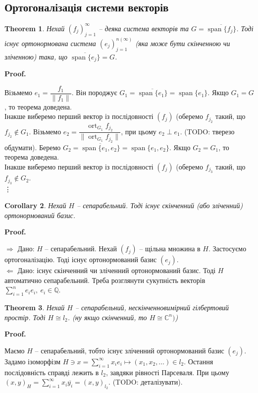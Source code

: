 \documentclass[a4paper, 10pt]{article}
\makeatletter
\def\rightproof{$\boxed{\Rightarrow}$ }
\def\leftproof{$\boxed{\Leftarrow}$ }
\theoremstyle{theoremdd}
\newtheorem{theorem}{Theorem}[subsection]
\theoremstyle{theoremdd}
\theoremstyle{theoremdd}
\theoremstyle{theoremdd}
\theoremstyle{theoremdd}
\theoremstyle{theoremdd}
\theoremstyle{theoremdd}
\theoremstyle{theoremdd}
\newtheorem{corollary}[theorem]{Corollary}
\DeclareMathOperator{\ort}{ort}
\renewenvironment{proof}[1][Proof.\\]{\par
\pushQED{\hfill \qed}%
\normalfont \topsep6\p@\@plus6\p@\relax
\trivlist
\item\relax
{\bfseries
#1\@addpunct{.}}\hspace\labelsep\ignorespaces
}{%
\popQED\endtrivlist\@endpefalse
}
\DeclareMathOperator{\linspan}{span}
\makeatother
\begin{document}
\subsection{Ортогоналізація системи векторів}
\begin{theorem}
Нехай $(f_j)_{j=1}^\infty$ -- деяка система векторів та $G = \overline{\linspan\{f_j\}}$. Тоді існує ортонормована система $(e_j)_{j=1}^{n (\infty)}$ (яка може бути скінченною чи зліченною) така, що $\overline{\linspan\{e_j\}} = G$.
\end{theorem}

\begin{proof}
Візьмемо $e_1 = \dfrac{f_1}{\|f_1\|}$. Він породжує $G_1 = \overline{\linspan\{e_1\}} = \linspan\{e_1\}$. Якщо $G_1 = G$, то теорема доведена.\\
Інакше виберемо перший вектор із послідовності $(f_j)$ (оберемо $f_{j_2}$ такий, що $f_{j_2} \notin G_1$. Візьмемо $e_2 = \dfrac{\ort_{G_1} f_{j_2}}{\| \ort_{G_1} f_{j_2}\|}$, при цьому $e_2 \perp e_1$. (TODO: тверезо обдумати). Беремо $G_2 = \overline{\linspan\{e_1,e_2\}} = \linspan\{e_1,e_2\}$. Якщо $G_2 = G_1$, то теорема доведена.\\
Інакше виберемо перший вектор із послідовності $(f_j)$ (оберемо $f_{j_3}$ такий, що $f_{j_3} \notin G_2$.\\
\vdots
\end{proof}

\begin{corollary}
Нехай $H$ -- сепарабельний. Тоді існує скінченний (або зліченний) ортонормований базис.
\end{corollary}

\begin{proof}
\rightproof Дано: $H$ -- сепарабельний. Нехай $(f_j)$ -- щільна множина в $H$. Застосуємо ортогоналізацію. Тоді існує ортонормований базис $(e_j)$.
\bigskip \\
\leftproof Дано: існує скінченний чи зліченний ортонормований базис. Тоді $H$ автоматично сепарабельний. Треба розглянути сукупність векторів $\displaystyle\sum_{i=1}^n e_i e_i,\ e_i \in \mathbb{Q}$.
\end{proof}

\begin{theorem}
Нехай $H$ -- сепарабельний, нескінченновимірний гілбертовий простір. Тоді $H \cong l_2$. (ну якщо скінченний, то $H \cong \mathbb{C}^n)$)
\end{theorem}

\begin{proof}
Маємо $H$ -- сепарабельний, тобто існує зліченний ортонормований базис $(e_j)$. Задамо ізоморфізм $H \ni x = \displaystyle\sum_{i=1}^\infty x_i e_i \mapsto (x_1,x_2,\dots) \in l_2$. Остання послідовність справді лежить в $l_2$, завдяки рівності Парсеваля. При цьому $(x,y)_H = \displaystyle\sum_{i=1}^\infty x_i \overline{y_i} = (x,y)_{l_2}$. (TODO: деталізувати).
\end{proof}
\end{document}
